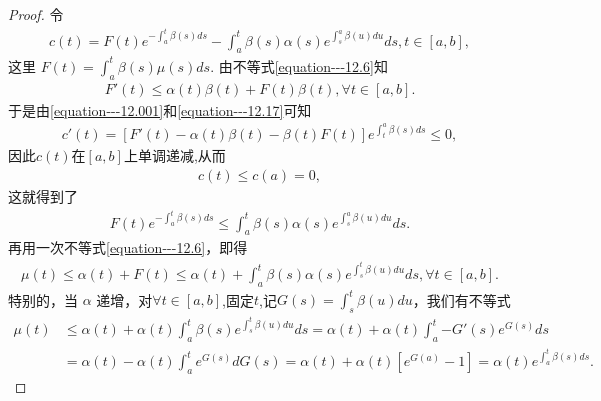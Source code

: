 \documentclass[../../main.tex]{subfiles}
\begin{document}
\begin{proof}
令
\begin{align}
c(t)=F(t)e^{-\int_{a}^{t}\beta(s)ds}-\int_{a}^{t}\beta(s)\alpha(s)e^{\int_{s}^{a}\beta(u)du}ds,t\in[a,b],\label{equation---12.001}
\end{align}
这里 $F(t)=\int_{a}^{t}\beta(s)\mu(s)ds$. 由不等式\eqref{equation---12.6}知
\begin{align}
F'(t)\leqslant\alpha(t)\beta(t)+F(t)\beta(t),\forall t\in[a,b].\label{equation---12.17}
\end{align}
于是由\eqref{equation---12.001}和\eqref{equation---12.17}可知
\begin{align*}
c'(t)=[F'(t)-\alpha(t)\beta(t)-\beta(t)F(t)]e^{\int_{t}^{a}\beta(s)ds}\leqslant0,
\end{align*}
因此$c(t)$在$[a,b]$上单调递减,从而
\begin{align*}
c(t)\leqslant c(a)=0,
\end{align*}
这就得到了
\begin{align*}
F(t)e^{-\int_{a}^{t}\beta(s)ds}\leqslant\int_{a}^{t}\beta(s)\alpha(s)e^{\int_{s}^{a}\beta(u)du}ds.
\end{align*}
再用一次不等式\eqref{equation---12.6}，即得
\begin{align*}
\mu(t)\leqslant\alpha(t)+F(t)\leqslant\alpha(t)+\int_{a}^{t}\beta(s)\alpha(s)e^{\int_{s}^{t}\beta(u)du}ds,\forall t\in[a,b].
\end{align*}
特别的，当 $\alpha$ 递增，对$\forall t\in [a,b]$,固定$t$,记$G(s)=\int_s^t{\beta (u)du}$，我们有不等式
\begin{align*}
\mu (t)&\leqslant \alpha (t)+\alpha (t)\int_a^t{\beta (s)e^{\int_s^t{\beta (u)du}}ds}=\alpha (t)+\alpha (t)\int_a^t{-G' \left( s \right) e^{G\left( s \right)}ds}
\\
&=\alpha (t)-\alpha (t)\int_a^t{e^{G\left( s \right)}dG\left( s \right)}=\alpha (t)+\alpha (t)\left[ e^{G\left( a \right)}-1 \right] =\alpha (t)e^{\int_a^t{\beta (s)ds}}.
\end{align*} 
\end{proof}
\end{document}
